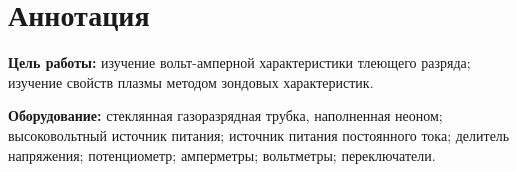 \section{Аннотация}
\textbf{Цель работы:}  изучение вольт-амперной характеристики тлеющего разряда; изучение свойств плазмы методом зондовых характеристик.

\textbf{Оборудование:} стеклянная газоразрядная трубка, наполненная неоном; высоковольтный источник питания; источник питания постоянного тока; делитель напряжения; потенциометр; амперметры; вольтметры; переключатели.
